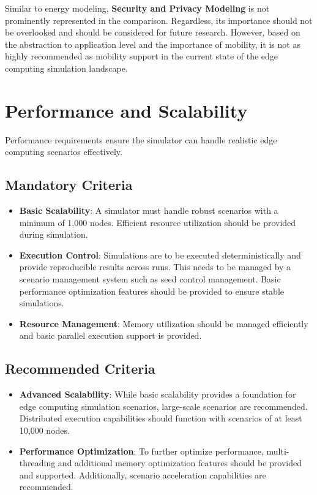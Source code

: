 Similar to energy modeling, \textbf{Security and Privacy Modeling} is not prominently represented in the comparison.
Regardless, its importance should not be overlooked and should be considered for future research.
However, based on the abstraction to application level and the importance of mobility, it is not as highly recommended as mobility support in the current state of the edge computing simulation landscape.

\section{Performance and Scalability}
Performance requirements ensure the simulator can handle realistic edge computing scenarios effectively.
\subsection{Mandatory Criteria}
\begin{itemize}
  \item \textbf{Basic Scalability}:
        A simulator must handle robust scenarios with a minimum of 1,000 nodes.
        Efficient resource utilization should be provided during simulation.
  \item \textbf{Execution Control}:
        Simulations are to be executed deterministically and provide reproducible results across runs.
        This needs to be managed by a scenario management system such as seed control management.
        Basic performance optimization features should be provided to ensure stable simulations.
  \item \textbf{Resource Management}:
        Memory utilization should be managed efficiently and basic parallel execution support is provided.
\end{itemize}

\subsection{Recommended Criteria}
\begin{itemize}
  \item \textbf{Advanced Scalability}:
        While basic scalability provides a foundation for edge computing simulation scenarios, large-scale scenarios are recommended.
        Distributed execution capabilities should function with scenarios of at least 10,000 nodes.
  \item \textbf{Performance Optimization}:
        To further optimize performance, multi-threading and additional memory optimization features should be provided and supported.
        Additionally, scenario acceleration capabilities are recommended.
\end{itemize}
